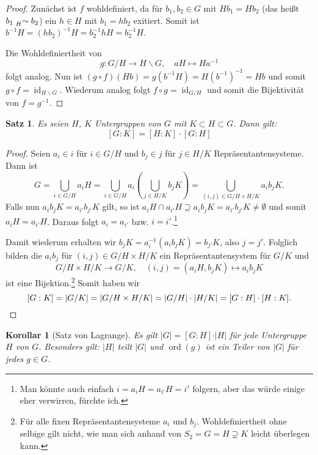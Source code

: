 \documentclass[12pt]{scrartcl} %
\DeclareMathOperator{\id}{id}
\DeclareMathOperator{\ord}{ord}
\newtheorem{thm}{Satz}
\newtheorem{kor}{Korollar}
\theoremstyle{definition}
\theoremstyle{remark}
\begin{document}
\begin{proof}
	Zunächst ist \(f\) wohldefiniert, da für $b_{1},b_{2} \in G$ mit $Hb_{1}=Hb_{2}$ (das heißt \(b_1 \mathrel{\prescript{}{H}{\sim}} b_2\)) ein $h \in H$ mit $b_1 = hb_2$ exitiert.
	Somit ist $b^{-1}H = (hb_2)^{-1}H = b_{2}^{-1}hH = b_{2}^{-1}H$.

	Die Wohldefiniertheit von $$g: G/H \to H\backslash G, \quad aH \mapsto Ha^{-1}$$ folgt analog.
	Nun ist $(g \circ f)(Hb) = g(b^{-1}H)=H(b^{-1})^{-1}=Hb$ und somit $g \circ f = \id_{H \backslash G}$.
	Wiederum analog folgt $f \circ g = \id_{G \slash H}$ und somit die Bijektivität von \(f = g^{-1}\).
\end{proof}

\begin{thm}
	Es seien $H$, $K$ Untergruppen von $G$ mit $K \subset H \subset G$.
	Dann gilt: $$[G:K]=[H:K]\cdot[G:H]$$
\end{thm}

\begin{proof}
	Seien \(a_i \in i\) für \(i \in G/H\) und \(b_j \in j\) für \(j \in H/K\) Repräsentantensysteme.
	Dann ist \[G = \bigcup_{i \in G/H} a_iH = \bigcup_{i \in G/H} a_i\left(\bigcup_{j\in H/K} b_jK\right) = \bigcup_{(i, j) \in G/H\times H/K} a_ib_jK.\]
	Falls nun \(a_ib_jK = a_{i'}b_{j'}K\) gilt, so ist \(a_iH \cap a_{i'}H \supseteq a_ib_jK = a_{i'}b_{j'}K \neq \emptyset\) und somit \(a_iH = a_{i'}H\).
	Daraus folgt \(a_i = a_{i'}\) bzw. \(i = i'\).\footnote{Man könnte auch einfach \(i = a_iH = a_{i'}H = i'\) folgern, aber das würde einige eher verwirren, fürchte ich.}

	Damit wiederum erhalten wir \(b_jK = a_i^{-1}(a_ib_jK) = b_{j'}K\), also \(j = j'\).
	Folglich bilden die \(a_ib_j\) für \((i, j) \in G/H\times H/K\) ein Repräsentantensystem für \(G/K\) und \[G/H\times H/K \to G/K, \quad (i, j) = (a_iH, b_jK) \mapsto a_ib_jK\] ist eine Bijektion.\footnote{Für alle fixen Repräsentantensysteme \(a_i\) und \(b_j\). Wohldefiniertheit ohne selbige gilt nicht, wie man sich anhand von \(S_2 = G = H \supsetneq K\) leicht überlegen kann.}
	Somit haben wir \[[G:K] = |G/K| = |G/H \times H/K| = |G/H|\cdot|H/K| = [G:H]\cdot[H:K].\qedhere\]
\end{proof}

\begin{kor}[Satz von Lagrange]
	Es gilt $\vert G\vert = [G:H]\cdot\vert H\vert$ für jede Untergruppe $H$ von $G$.
	Besonders gilt: $\vert H\vert$ teilt $\vert G\vert$ und $\ord(g)$ ist ein Teiler von $\vert G\vert$ für jedes $g\in G$.
\end{kor}
\end{document}
